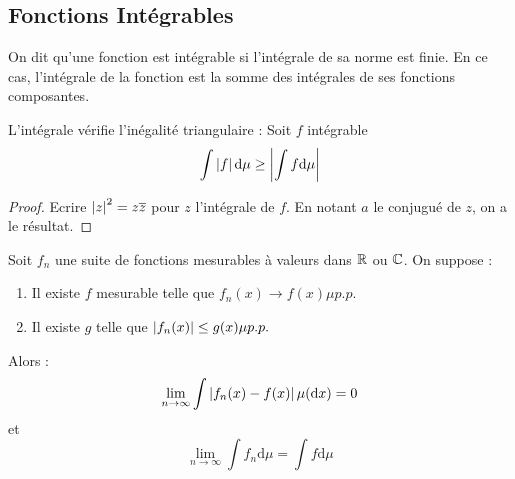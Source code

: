\documentclass{cours}
\begin{document}
    \subsection{Fonctions Intégrables}
    \begin{definition}
        On dit qu'une fonction est intégrable si l'intégrale de sa norme est finie. En ce cas, l'intégrale de la fonction est la somme des intégrales de ses fonctions composantes.
    \end{definition}
    \begin{theorem}
        L'intégrale vérifie l'inégalité triangulaire : Soit $f$ intégrable
        \[
            \int \left|f\right| \mathrm{d}\mu \geq \left|\int f \mathrm{d}\mu\right|
        \]
    \end{theorem}
    \begin{proof}
        Ecrire $\left|z\right|^{2} = z\overline{z}$ pour $z$ l'intégrale de $f$. En notant $a$ le conjugué de $z$, on a le résultat.
    \end{proof}

    \begin{theorem}\label{TCD}
        Soit $f_{n}$ une suite de fonctions mesurables à valeurs dans $\mathbb{R}$ ou $\mathbb{C}$. On suppose :
        \begin{enumerate}
            \item Il existe $f$ mesurable telle que $f_{n}(x) \to f(x) \mu p.p.$
            \item Il existe $g$ telle que $\left|f_{n}(x)\right| \leq g(x) \mu p.p.$
        \end{enumerate}
        Alors : 
        \[
            \lim_{n\to \infty} \int \left|f_{n}(x) - f(x)\right| \mu(\mathrm{d}x) = 0
        \]
        et 
        \[
            \lim_{n \to \infty} \int f_{n} \mathrm{d}\mu = \int f \mathrm{d}\mu   
        \]
    \end{theorem}
\end{document}
